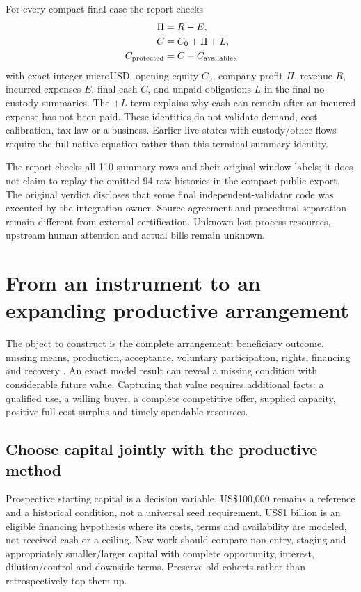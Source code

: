 \documentclass[11pt,letterpaper]{article}
\begin{document}
For every compact final case the report checks
\begin{align}
\Pi &= R-E,\\
C &= C_0+\Pi+L,\\
C_{\rm protected}&=C-C_{\rm available},
\end{align}
with exact integer microUSD, opening equity $C_0$, company profit $\Pi$, revenue $R$, incurred expenses $E$, final cash $C$, and unpaid obligations $L$ in the final no-custody summaries. The $+L$ term explains why cash can remain after an incurred expense has not been paid. These identities do not validate demand, cost calibration, tax law or a business. Earlier live states with custody/other flows require the full native equation rather than this terminal-summary identity.

The report checks all 110 summary rows and their original window labels; it does not claim to replay the omitted 94 raw histories in the compact public export. The original verdict discloses that some final independent-validator code was executed by the integration owner. Source agreement and procedural separation remain different from external certification. Unknown lost-process resources, upstream human attention and actual bills remain unknown.

\section{From an instrument to an expanding productive arrangement}
The object to construct is the complete arrangement: beneficiary outcome, missing means, production, acceptance, voluntary participation, rights, financing and recovery \cite{economy,frontier}. An exact model result can reveal a missing condition with considerable future value. Capturing that value requires additional facts: a qualified use, a willing buyer, a complete competitive offer, supplied capacity, positive full-cost surplus and timely spendable resources.

\subsection{Choose capital jointly with the productive method}
Prospective starting capital is a decision variable. US\$100,000 remains a reference and a historical condition, not a universal seed requirement. US\$1 billion is an eligible financing hypothesis where its costs, terms and availability are modeled, not received cash or a ceiling. New work should compare non-entry, staging and appropriately smaller/larger capital with complete opportunity, interest, dilution/control and downside terms. Preserve old cohorts rather than retrospectively top them up.
\end{document}
